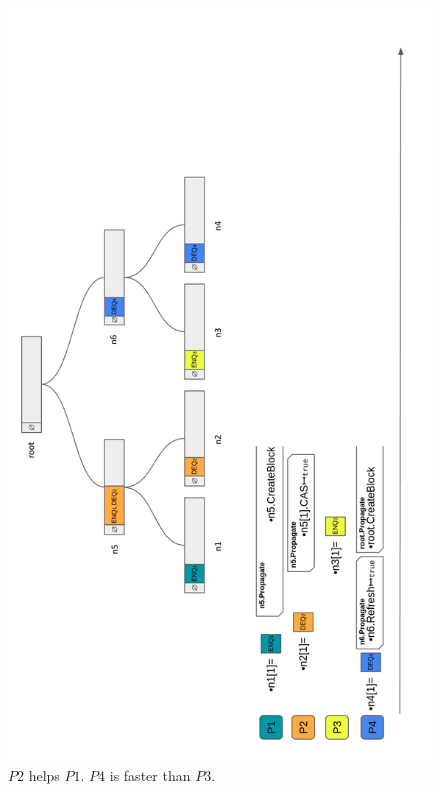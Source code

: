 \documentclass[10pt]{article}
\theoremstyle{definition}
\begin{document}
\begin{figure}
  \center\includegraphics[width=4.8in]{thesis/pics/exec2.png}
  \caption{$P2$ helps $P1$. $P4$ is faster than $P3$. \label{fig::exec2}}
\end{figure}
\end{document}
